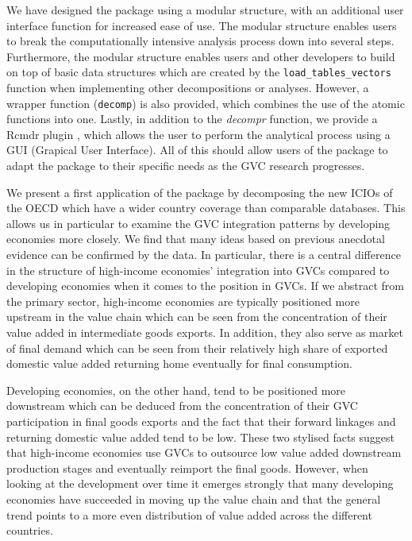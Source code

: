 \documentclass[a4paper,11pt]{article}
\begin{document}
We have designed the package using a modular structure, with an additional user interface function for increased ease of use. The modular structure enables users to break the computationally intensive analysis process down into several steps. Furthermore, the modular structure enables users and other developers to build on top of basic data structures which are created by the \verb!load_tables_vectors! function when implementing other decompositions or analyses. However, a wrapper function (\verb!decomp!) is also provided, which combines the use of the atomic functions into one. Lastly, in addition to the \textit{decompr} function, we provide a Rcmdr plugin \citep{fox2005getting, fox2007extending}, which allows the user to perform the analytical process using a GUI (Grapical User Interface). All of this should allow users of the package to adapt the package to their specific needs as the GVC research progresses.

We present a first application of the package by decomposing the new ICIOs of the OECD which have a wider country coverage than comparable databases. This allows us in particular to examine the GVC integration patterns by developing economies more closely. We find that many ideas based on previous anecdotal evidence can be confirmed by the data. In particular, there is a central difference in the structure of high-income economies' integration into GVCs compared to developing economies when it comes to the position in GVCs. If we abstract from the primary sector, high-income economies are typically positioned more upstream in the value chain which can be seen from the concentration of their value added in intermediate goods exports. In addition, they also serve as market of final demand which can be seen from their relatively high share of exported domestic value added returning home eventually for final consumption.

Developing economies, on the other hand, tend to be positioned more downstream which can be deduced from the concentration of their GVC participation in final goods exports and the fact that their forward linkages and returning domestic value added tend to be low. These two stylised facts suggest that high-income economies use GVCs to outsource low value added downstream production stages and eventually reimport the final goods. However, when looking at the development over time it emerges strongly that many developing economies have succeeded in moving up the value chain and that the general trend points to a more even distribution of value added across the different countries.
\end{document}
